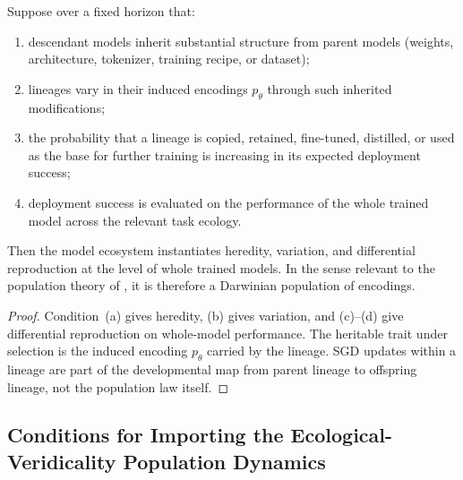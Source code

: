 \documentclass[twoside,11pt]{article}
\begin{document}
\begin{proposition}\label{prop:darwinian-llm}
Suppose over a fixed horizon that:
\begin{enumerate}[label=(\alph*)]
\item descendant models inherit substantial structure from parent models (weights, architecture, tokenizer, training recipe, or dataset);
\item lineages vary in their induced encodings $p_\theta$ through such inherited modifications;
\item the probability that a lineage is copied, retained, fine-tuned, distilled, or used as the base for further training is increasing in its expected deployment success;
\item deployment success is evaluated on the performance of the whole trained model across the relevant task ecology.
\end{enumerate}
Then the model ecosystem instantiates heredity, variation, and differential reproduction at the level of whole trained models. In the sense relevant to the population theory of \citet{dallariva_2026}, it is therefore a Darwinian population of encodings.
\end{proposition}

\begin{proof}
Condition~(a) gives heredity, (b) gives variation, and (c)--(d) give differential reproduction on whole-model performance. The heritable trait under selection is the induced encoding $p_\theta$ carried by the lineage. SGD updates within a lineage are part of the developmental map from parent lineage to offspring lineage, not the population law itself.
\end{proof}

\subsection{Conditions for Importing the Ecological-Veridicality Population Dynamics}
\end{document}

